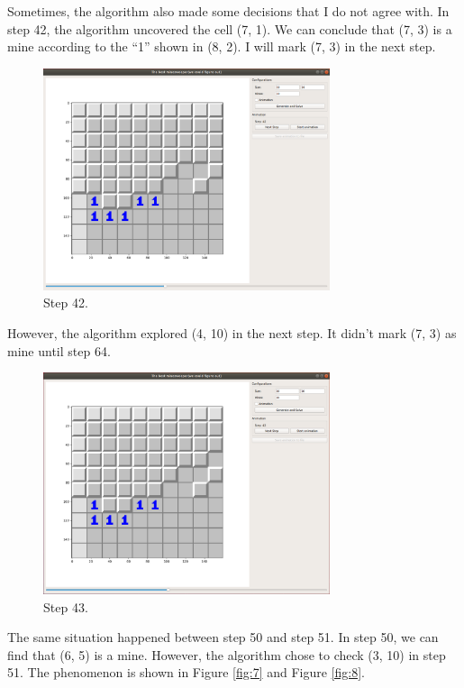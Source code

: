 \documentclass[letter]{article}
\begin{document}
\begin{enumerate}
	
	Sometimes, the algorithm also made some decisions that I do not agree with. In step 42, the algorithm uncovered the cell (7, 1). We can conclude that (7, 3) is a mine according to the ``1'' shown in (8, 2). I will mark (7, 3) in the next step.
	
	\begin{figure}[H]
		\centering
		\includegraphics[width=0.75\textwidth]{../pics/5.png}
		\caption{\label{fig:5} Step 42.}
	\end{figure}
	However, the algorithm explored (4, 10) in the next step. It didn’t mark (7, 3) as mine until step 64.
	
	\begin{figure}[H]
		\centering
		\includegraphics[width=0.75\textwidth]{../pics/6.png}
		\caption{\label{fig:6} Step 43.}
	\end{figure}
	
	The same situation happened between step 50 and step 51. In step 50, we can find that (6, 5) is a mine. However, the algorithm chose to check (3, 10) in step 51. The phenomenon is shown in Figure \ref{fig:7} and Figure \ref{fig:8}.
	

\end{enumerate}
\end{document}
